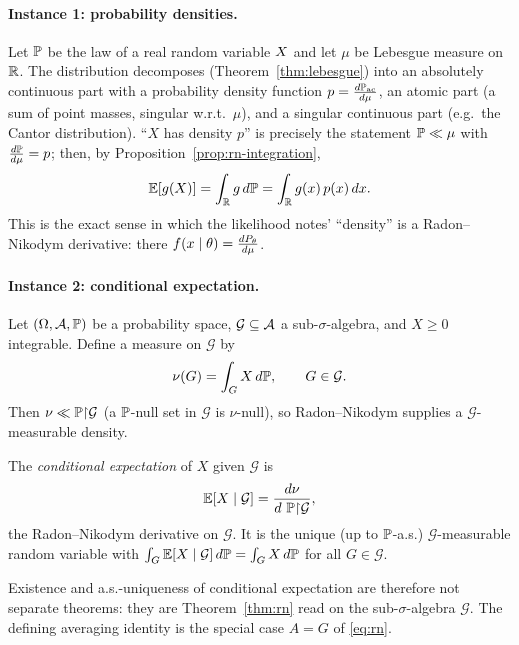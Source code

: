 \paragraph{Instance 1: probability densities.}
Let $\mathbb{P}$ be the law of a real random variable $X$ and let $\mu$ be
Lebesgue measure on $\mathbb{R}$. The distribution decomposes (Theorem~\ref{thm:lebesgue})
into an absolutely continuous part with a probability density function
$p = \frac{d \mathbb{P}_{\mathrm{ac}}}{d \mu}$, an atomic part (a sum of point masses,
singular w.r.t.\ $\mu$), and a singular continuous part (e.g.\ the Cantor
distribution). ``$X$ has density $p$'' is precisely the statement
$\mathbb{P} \ll \mu$ with $\frac{d \mathbb{P}}{d \mu} = p$; then, by
Proposition~\ref{prop:rn-integration},
\begin{equation}
  \mathbb{E}[g(X)] = \int_{\mathbb{R}} g \, d\mathbb{P} = \int_{\mathbb{R}} g(x)\, p(x)\, dx.
\end{equation}
This is the exact sense in which the likelihood notes' ``density'' is a
Radon--Nikodym derivative: there $f(x \mid \theta) = \frac{d P_\theta}{d \mu}$.

\paragraph{Instance 2: conditional expectation.}
Let $(\Omega, \mathcal{A}, \mathbb{P})$ be a probability space, $\mathcal{G} \subseteq
\mathcal{A}$ a sub-$\sigma$-algebra, and $X \ge 0$ integrable. Define a measure on
$\mathcal{G}$ by
\begin{equation}
  \nu(G) = \int_G X \, d\mathbb{P}, \qquad G \in \mathcal{G}.
\end{equation}
Then $\nu \ll \mathbb{P}\mathord{\restriction}\mathcal{G}$ (a $\mathbb{P}$-null set in $\mathcal{G}$
is $\nu$-null), so Radon--Nikodym supplies a $\mathcal{G}$-measurable density.

\begin{definition}
The \emph{conditional expectation} of $X$ given $\mathcal{G}$ is
\begin{equation}
  \E[X \mid \mathcal{G}] = \RN{\nu}{\ \Prob\restr\mathcal{G}},
\end{equation}
the Radon--Nikodym derivative on $\mathcal{G}$. It is the unique (up to
$\mathbb{P}$-a.s.) $\mathcal{G}$-measurable random variable with
$\int_G \mathbb{E}[X \mid \mathcal{G}] \, d\mathbb{P} = \int_G X \, d\mathbb{P}$ for all
$G \in \mathcal{G}$.
\end{definition}

Existence and a.s.-uniqueness of conditional expectation are therefore not
separate theorems: they are Theorem~\ref{thm:rn} read on the sub-$\sigma$-algebra
$\mathcal{G}$. The defining averaging identity is the special case $A = G$ of
\eqref{eq:rn}.
